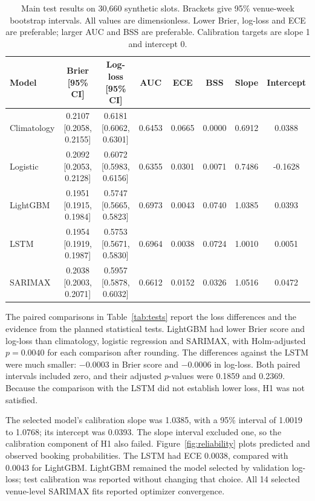 \begin{table}[t]
\centering
\caption{Main test results on 30,660 synthetic slots. Brackets give 95\% venue-week bootstrap intervals. All values are dimensionless. Lower Brier, log-loss and ECE are preferable; larger AUC and BSS are preferable. Calibration targets are slope 1 and intercept 0.}
\label{tab:main}
\footnotesize
\setlength{\tabcolsep}{3.5pt}
\begin{tabular}{lccccccc}
\toprule
Model & Brier [95\% CI] & Log-loss [95\% CI] & AUC & ECE & BSS & Slope & Intercept \\
\midrule
Climatology & 0.2107 [0.2058, 0.2155] & 0.6181 [0.6062, 0.6301] & 0.6453 & 0.0665 & 0.0000 & 0.6912 & 0.0388 \\
Logistic & 0.2092 [0.2053, 0.2128] & 0.6072 [0.5983, 0.6156] & 0.6355 & 0.0301 & 0.0071 & 0.7486 & -0.1628 \\
LightGBM & 0.1951 [0.1915, 0.1984] & 0.5747 [0.5665, 0.5823] & 0.6973 & 0.0043 & 0.0740 & 1.0385 & 0.0393 \\
LSTM & 0.1954 [0.1919, 0.1987] & 0.5753 [0.5671, 0.5830] & 0.6964 & 0.0038 & 0.0724 & 1.0010 & 0.0051 \\
SARIMAX & 0.2038 [0.2003, 0.2071] & 0.5957 [0.5878, 0.6032] & 0.6612 & 0.0152 & 0.0326 & 1.0516 & 0.0472 \\
\bottomrule
\end{tabular}
\end{table}

The paired comparisons in Table~\ref{tab:tests} report the loss differences and the evidence from the planned statistical tests. LightGBM had lower Brier score and log-loss than climatology, logistic regression and SARIMAX, with Holm-adjusted $p=0.0040$ for each comparison after rounding. The differences against the LSTM were much smaller: $-0.0003$ in Brier score and $-0.0006$ in log-loss. Both paired intervals included zero, and their adjusted $p$-values were 0.1859 and 0.2369. Because the comparison with the LSTM did not establish lower loss, H1 was not satisfied.

The selected model's calibration slope was 1.0385, with a 95\% interval of 1.0019 to 1.0768; its intercept was 0.0393. The slope interval excluded one, so the calibration component of H1 also failed. Figure~\ref{fig:reliability} plots predicted and observed booking probabilities. The LSTM had ECE 0.0038, compared with 0.0043 for LightGBM. LightGBM remained the model selected by validation log-loss; test calibration was reported without changing that choice. All 14 selected venue-level SARIMAX fits reported optimizer convergence.


